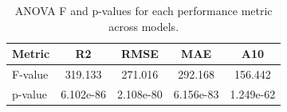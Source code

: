 \begin{table}
\centering
\caption{ANOVA F and p-values for each performance metric across models.}
\label{tab:anova_metrics}
\begin{tabular}{lcccc}
\toprule
Metric &         R2 &       RMSE &        MAE &        A10 \\
\midrule
F-value &    319.133 &    271.016 &    292.168 &    156.442 \\
p-value &  6.102e-86 &  2.108e-80 &  6.156e-83 &  1.249e-62 \\
\bottomrule
\end{tabular}
\end{table}
